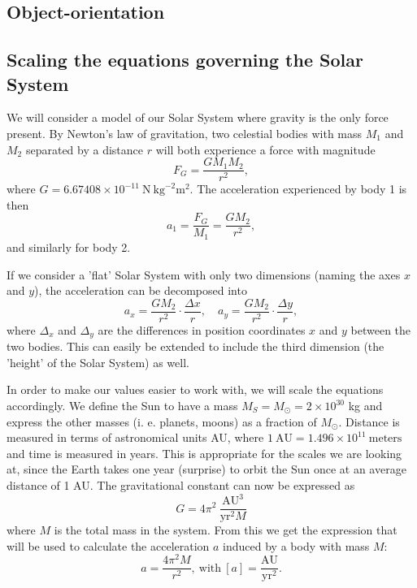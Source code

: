 \documentclass{emulateapj}
\begin{document}
\subsection{Object-orientation}


\subsection{Scaling the equations governing the Solar System}
We will consider a model of our Solar System where gravity is the only force present. By Newton's law of gravitation, two celestial bodies with mass $M_1$ and $M_2$ separated by a distance $r$ will both experience a force with magnitude
%
\begin{equation}\label{eq:gforce}
    F_G = \frac{G M_1 M_2}{r^2},
\end{equation}
where $G = 6.67408 \times 10^{-11} \ \textrm{N} \ \textrm{kg}^{-2} \textrm{m}^2$. The acceleration experienced by body 1 is then
%
\begin{equation*}
    a_1 = \frac{F_G}{M_1} = \frac{G M_2}{r^2},
\end{equation*}
%
and similarly for body 2.

If we consider a 'flat' Solar System with only two dimensions (naming the axes $x$ and $y$), the acceleration can be decomposed into
%
\begin{equation*}
    a_x = \frac{G M_2}{r^2}\cdot\frac{\Delta x}{r}, \quad a_y = \frac{G M_2}{r^2}\cdot\frac{\Delta y}{r},
\end{equation*}
%
where $\Delta_x$ and $\Delta_y$ are the differences in position coordinates $x$ and $y$ between the two bodies. This can easily be extended to include the third dimension (the 'height' of the Solar System) as well. 

In order to make our values easier to work with, we will scale the equations accordingly. We define the Sun to have a mass $M_S = M_\odot = 2\times 10^{30}$ kg and express the other masses (i. e. planets, moons) as a fraction of $M_\odot$. Distance is measured in terms of astronomical units AU, where $1 \ \textrm{AU} = 1.496 \times 10^{11} \ \textrm{meters}$ and time is measured in years. This is appropriate for the scales we are looking at, since the Earth takes one year (surprise) to orbit the Sun once at an average distance of 1 AU. The gravitational constant can now be expressed as 
%
\begin{equation*}
G = 4\pi^2 \ \frac{\textrm{AU}^3}{\textrm{yr}^{2}M} 
\end{equation*}
%
where $M$ is the total mass in the system. From this we get the expression that will be used to calculate the acceleration $a$ induced by a body with mass $M$:
%
\begin{equation*}
a = \frac{4\pi^2 M}{r^2}, \ \textrm{with} \ [a] = \frac{\textrm{AU}}{\textrm{yr}^2}.
\end{equation*}
\end{document}
